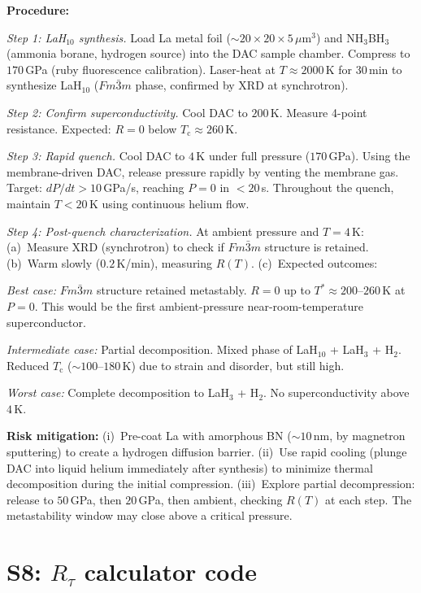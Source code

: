 \documentclass[prb,twocolumn,superscriptaddress,longbibliography,floatfix]{revtex4-2}
\newcommand{\tauasym}{\tau}
\newcommand{\Rtau}{R_{\tauasym}}
\newcommand{\Tc}{T_{\mathrm{c}}}
\begin{document}
\textbf{Procedure:}

\emph{Step 1: LaH$_{10}$ synthesis.}
Load La metal foil ($\sim 20 \times 20 \times 5\,\mu$m$^3$)
and NH$_3$BH$_3$ (ammonia borane, hydrogen source) into the
DAC sample chamber.  Compress to $170\,$GPa (ruby fluorescence
calibration).  Laser-heat at $T \approx 2000\,$K for 30\,min
to synthesize LaH$_{10}$ ($Fm\bar{3}m$ phase, confirmed by
XRD at synchrotron).

\emph{Step 2: Confirm superconductivity.}
Cool DAC to $200\,$K.  Measure 4-point resistance.  Expected:
$R = 0$ below $\Tc \approx 260\,$K.

\emph{Step 3: Rapid quench.}
Cool DAC to $4\,$K under full pressure ($170\,$GPa).
Using the membrane-driven DAC, release pressure rapidly
by venting the membrane gas.  Target: $dP/dt > 10\,$GPa/s,
reaching $P = 0$ in $< 20\,$s.  Throughout the quench,
maintain $T < 20\,$K using continuous helium flow.

\emph{Step 4: Post-quench characterization.}
At ambient pressure and $T = 4\,$K:
(a)~Measure XRD (synchrotron) to check if $Fm\bar{3}m$
structure is retained.
(b)~Warm slowly ($0.2\,$K/min), measuring $R(T)$.
(c)~Expected outcomes:

\emph{Best case:} $Fm\bar{3}m$ structure retained metastably.
$R = 0$ up to $T^* \approx 200$--$260\,$K at $P = 0$.
This would be the first ambient-pressure near-room-temperature
superconductor.

\emph{Intermediate case:} Partial decomposition.  Mixed phase
of LaH$_{10}$ + LaH$_3$ + H$_2$.  Reduced $\Tc$ ($\sim 100$--$180\,$K)
due to strain and disorder, but still high.

\emph{Worst case:} Complete decomposition to LaH$_3$ + H$_2$.
No superconductivity above $4\,$K.

\textbf{Risk mitigation:}
(i)~Pre-coat La with amorphous BN ($\sim 10\,$nm, by magnetron
sputtering) to create a hydrogen diffusion barrier.
(ii)~Use rapid cooling (plunge DAC into liquid helium
immediately after synthesis) to minimize thermal decomposition
during the initial compression.
(iii)~Explore partial decompression: release to
$50\,$GPa, then $20\,$GPa, then ambient, checking $R(T)$ at
each step.  The metastability window may close above a critical
pressure.

\section{S8: $\Rtau$ calculator code}
\label{sec:S8}
\end{document}
